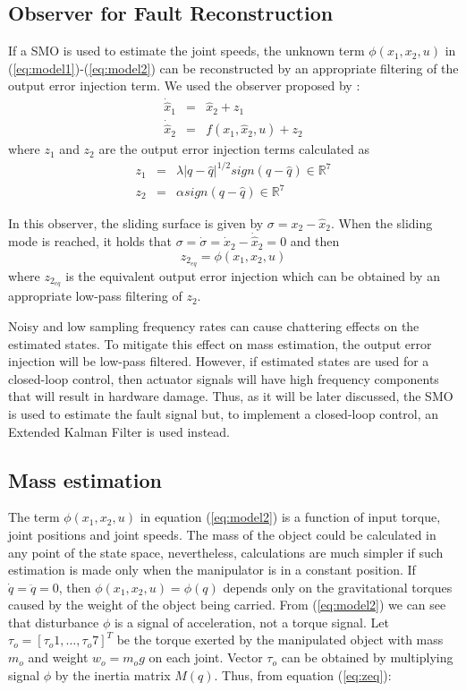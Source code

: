 \documentclass[conference,letterpaper]{ieeeconf}
\begin{document}
\subsection{Observer for Fault Reconstruction}
If a SMO is used to estimate the joint speeds, the unknown term $\phi(x_1, x_2, u)$ in (\ref{eq:model1})-(\ref{eq:model2}) can be reconstructed by an appropriate filtering of the output error injection term. We used the observer proposed by \cite{shtessel2014sliding}:
  \begin{eqnarray}
    \dot{\hat{x}}_1 &=& \hat{x}_2 + z_1\label{eq:observer1}\\
    \dot{\hat{x}}_2 &=& f(x_1, \hat{x}_2, u) + z_2\label{eq:observer2}
  \end{eqnarray}
  where $z_1$ and $z_2$ are the output error injection terms calculated as
  \begin{eqnarray*}
    z_1 &=& \lambda\vert q - \hat{q}\vert ^{1/2}sign(q - \hat{q}) \in \mathbb{R}^7\\
    z_2 &=& \alpha sign(q - \hat{q}) \in \mathbb{R}^7
  \end{eqnarray*}

  In this observer, the sliding surface is given by $\sigma = x_2 - \hat{x}_2$. When the sliding mode is reached, it holds that $\sigma = \dot{\sigma} = \dot{x}_2 - \dot{\hat{x}}_2 = 0$ and then
\begin{equation}
  z_{2_{eq}} =  \phi(x_1, x_2, u) 
  \label{eq:zeq}
\end{equation}
where $z_{2_{eq}}$ is the equivalent output error injection which can be obtained by an appropriate low-pass filtering of $z_2$.

Noisy and low sampling frequency rates can cause chattering effects on the estimated states. To mitigate this effect on mass estimation, the output error injection will be low-pass filtered. However, if estimated states are used for a closed-loop control, then actuator signals will have high frequency components that will result in hardware damage. Thus, as it will be later discussed, the SMO is used to estimate the fault signal but, to implement a closed-loop control, an Extended Kalman Filter is used instead. 

\subsection{Mass estimation}
\label{sec:MassEstimation}
The term $\phi(x_1, x_2, u)$ in equation (\ref{eq:model2}) is a function of input torque, joint positions and joint speeds. The mass of the object could be calculated in any point of the state space, nevertheless, calculations are much simpler if such estimation is made only when the manipulator is in a constant position. If $\dot{q}= \ddot{q} = 0$, then $\phi(x_1, x_2, u) = \phi(q)$ depends only on the gravitational torques caused by the weight of the object being carried. From (\ref{eq:model2}) we can see that disturbance $\phi$ is a signal of acceleration, not a torque signal. Let $\tau_o = [\tau_o1,\dots,\tau_o7]^T$ be the torque exerted by the manipulated object with mass $m_o$ and weight $w_o=m_o g$ on each joint. Vector $\tau_o$ can be obtained by multiplying signal $\phi$ by the inertia matrix $M(q)$. Thus, from equation (\ref{eq:zeq}):
\end{document}
